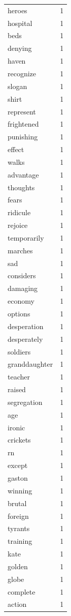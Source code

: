 \begin{tabular}{lr}
heroes & 1 \\
hospital & 1 \\
beds & 1 \\
denying & 1 \\
haven & 1 \\
recognize & 1 \\
slogan & 1 \\
shirt & 1 \\
represent & 1 \\
frightened & 1 \\
punishing & 1 \\
effect & 1 \\
walks & 1 \\
advantage & 1 \\
thoughts & 1 \\
fears & 1 \\
ridicule & 1 \\
rejoice & 1 \\
temporarily & 1 \\
marches & 1 \\
sad & 1 \\
considers & 1 \\
damaging & 1 \\
economy & 1 \\
options & 1 \\
desperation & 1 \\
desperately & 1 \\
soldiers & 1 \\
granddaughter & 1 \\
teacher & 1 \\
raised & 1 \\
segregation & 1 \\
age & 1 \\
ironic & 1 \\
crickets & 1 \\
rn & 1 \\
except & 1 \\
gaston & 1 \\
winning & 1 \\
brutal & 1 \\
foreign & 1 \\
tyrants & 1 \\
training & 1 \\
kate & 1 \\
golden & 1 \\
globe & 1 \\
complete & 1 \\
action & 1 \\

\end{tabular}
